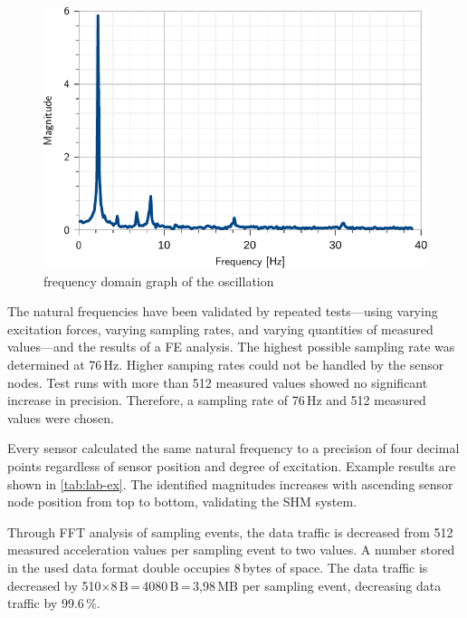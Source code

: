 \documentclass[12pt,a4paper]{scrartcl}
\begin{document}
\begin{figure}[htb]
    \centering
    \includegraphics[scale=0.9]{figures/76HzHalf.pdf}
    \caption{frequency domain graph of the oscillation}
    \label{fig:76hzfft}
\end{figure}

The natural frequencies have been validated by repeated tests---using varying excitation forces, varying sampling rates, and varying quantities of measured values---and the results of a FE analysis.
The highest possible sampling rate was determined at 76\,Hz.
Higher samping rates could not be handled by the sensor nodes.
Test runs with more than 512 measured values showed no significant increase in precision.
Therefore, a sampling rate of 76\,Hz and 512 measured values were chosen.

Every sensor calculated the same natural frequency to a precision of four decimal points regardless of sensor position and degree of excitation.
Example results are shown in \autoref{tab:lab-ex}.
The identified magnitudes increases with ascending sensor node position from top to bottom, validating the SHM system.

Through FFT analysis of sampling events, the data traffic is decreased from 512 measured acceleration values per sampling event to two values.
A number stored in the used data format double occupies 8\,bytes of space.
The data traffic is decreased by 510$\times$8\,B\,=\,4080\,B\,=\,3,98\,MB per sampling event, decreasing data traffic by 99.6\,\%.
\end{document}
